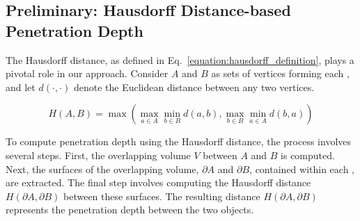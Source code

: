 \subsection{Preliminary: Hausdorff Distance-based Penetration Depth}
\label{sec:preliminary}



The Hausdorff distance, as defined in Eq.~\ref{equation:hausdorff_definition}, plays a pivotal role in our approach.
Consider $A$ and $B$ as sets of vertices forming each , and let $d(\cdot, \cdot)$ denote the Euclidean distance between any two vertices.

\begin{equation}
    H(A,B) = \max \left( \max_{a \in A} \min_{b \in B} d(a,b) ,
    \max_{b \in B} \min_{a \in A} d(b,a) \right)
    \label{equation:hausdorff_definition}
\end{equation}
%

To compute penetration depth using the Hausdorff distance, the process involves several steps.
First, the overlapping volume $V$ between  $A$ and $B$ is computed.
Next, the surfaces of the overlapping volume, $\partial A$ and $\partial B$, contained within each , are extracted.
The final step involves computing the Hausdorff distance $H(\partial A, \partial B)$ between these surfaces.
The resulting distance $H(\partial A, \partial B)$ represents the penetration depth between the two objects.


